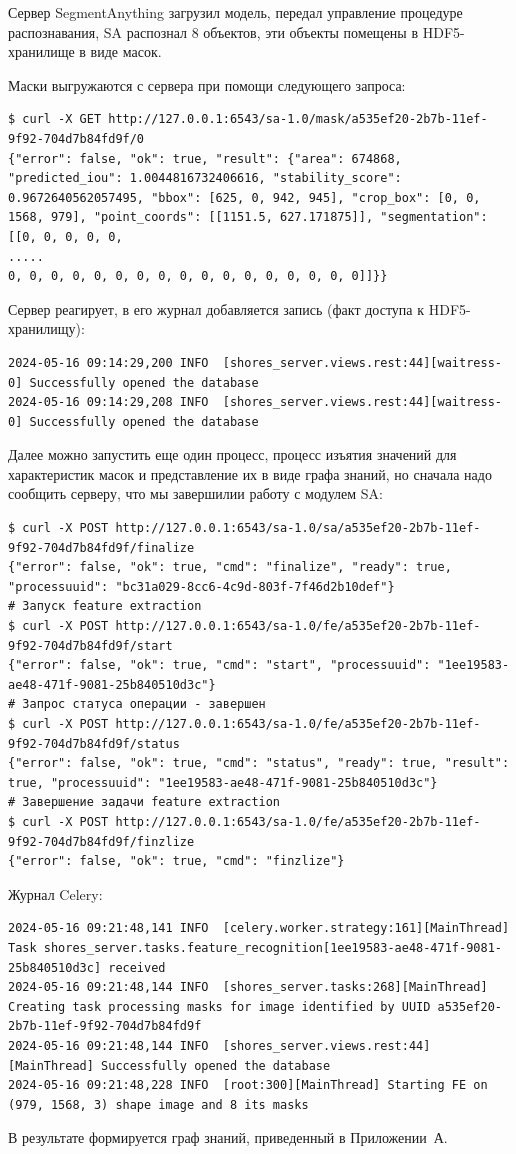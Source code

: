 \documentclass[732,14pt,final]{studrep}
\begin{document}
Сервер SegmentAnything загрузил модель, передал управление процедуре распознавания, SA распознал 8 объектов, эти объекты помещены в HDF5-хранилище в виде масок.

Маски выгружаются с сервера при помощи следующего запроса:
\begin{verbatim}
$ curl -X GET http://127.0.0.1:6543/sa-1.0/mask/a535ef20-2b7b-11ef-9f92-704d7b84fd9f/0
{"error": false, "ok": true, "result": {"area": 674868, "predicted_iou": 1.0044816732406616, "stability_score": 0.9672640562057495, "bbox": [625, 0, 942, 945], "crop_box": [0, 0, 1568, 979], "point_coords": [[1151.5, 627.171875]], "segmentation": [[0, 0, 0, 0, 0, 
.....
0, 0, 0, 0, 0, 0, 0, 0, 0, 0, 0, 0, 0, 0, 0, 0, 0]]}}
\end{verbatim}

Сервер реагирует, в его журнал добавляется запись (факт доступа к HDF5-хранилищу):
\begin{verbatim}
2024-05-16 09:14:29,200 INFO  [shores_server.views.rest:44][waitress-0] Successfully opened the database
2024-05-16 09:14:29,208 INFO  [shores_server.views.rest:44][waitress-0] Successfully opened the database 
\end{verbatim}

Далее можно запустить еще один процесс, процесс изъятия значений для характеристик масок и представление их в виде графа знаний, но сначала надо сообщить серверу, что мы завершилии работу с модулем SA:
\begin{verbatim}
$ curl -X POST http://127.0.0.1:6543/sa-1.0/sa/a535ef20-2b7b-11ef-9f92-704d7b84fd9f/finalize
{"error": false, "ok": true, "cmd": "finalize", "ready": true, "processuuid": "bc31a029-8cc6-4c9d-803f-7f46d2b10def"}
# Запуск feature extraction
$ curl -X POST http://127.0.0.1:6543/sa-1.0/fe/a535ef20-2b7b-11ef-9f92-704d7b84fd9f/start
{"error": false, "ok": true, "cmd": "start", "processuuid": "1ee19583-ae48-471f-9081-25b840510d3c"}
# Запрос статуса операции - завершен
$ curl -X POST http://127.0.0.1:6543/sa-1.0/fe/a535ef20-2b7b-11ef-9f92-704d7b84fd9f/status
{"error": false, "ok": true, "cmd": "status", "ready": true, "result": true, "processuuid": "1ee19583-ae48-471f-9081-25b840510d3c"}
# Завершение задачи feature extraction
$ curl -X POST http://127.0.0.1:6543/sa-1.0/fe/a535ef20-2b7b-11ef-9f92-704d7b84fd9f/finzlize
{"error": false, "ok": true, "cmd": "finzlize"}
\end{verbatim}

Журнал Celery:
\begin{verbatim}
2024-05-16 09:21:48,141 INFO  [celery.worker.strategy:161][MainThread] Task shores_server.tasks.feature_recognition[1ee19583-ae48-471f-9081-25b840510d3c] received
2024-05-16 09:21:48,144 INFO  [shores_server.tasks:268][MainThread] Creating task processing masks for image identified by UUID a535ef20-2b7b-11ef-9f92-704d7b84fd9f
2024-05-16 09:21:48,144 INFO  [shores_server.views.rest:44][MainThread] Successfully opened the database
2024-05-16 09:21:48,228 INFO  [root:300][MainThread] Starting FE on (979, 1568, 3) shape image and 8 its masks
\end{verbatim}
В результате формируется граф знаний, приведенный в Приложении~А.
\end{document}
